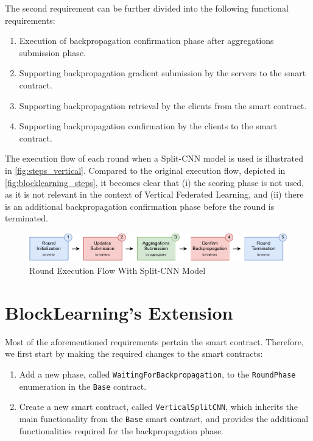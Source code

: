 The second requirement can be further divided into the following functional requirements:

\begin{enumerate}
    \item Execution of backpropagation confirmation phase after aggregations submission phase.
    \item Supporting backpropagation gradient submission by the servers to the smart contract.
    \item Supporting backpropagation retrieval by the clients from the smart contract.
    \item Supporting backpropagation confirmation by the clients to the smart contract.
\end{enumerate}

The execution flow of each round when a Split-CNN model is used is illustrated in \autoref{fig:steps_vertical}. Compared to the original execution flow, depicted in \autoref{fig:blocklearning_steps}, it becomes clear that (i) the scoring phase is not used, as it is not relevant in the context of Vertical Federated Learning, and (ii) there is an additional backpropagation confirmation phase before the round is terminated. 

\begin{figure}[!ht]
    \centering
    \includegraphics[width=1\textwidth]{graphics/sequence-vertical.pdf}
    \caption{Round Execution Flow With Split-CNN Model}
    \label{fig:steps_vertical}
\end{figure}

\section{BlockLearning's Extension}

Most of the aforementioned requirements pertain the smart contract. Therefore, we first start by making the required changes to the smart contracts:

\begin{enumerate}
    \item Add a new phase, called \texttt{WaitingForBackpropagation}, to the \texttt{RoundPhase} enumeration in the \texttt{Base} contract.
    
    \item Create a new smart contract, called \texttt{VerticalSplitCNN}, which inherits the main functionality from the \texttt{Base} smart contract, and provides the additional functionalities required for the backpropagation phase.
\end{enumerate}

